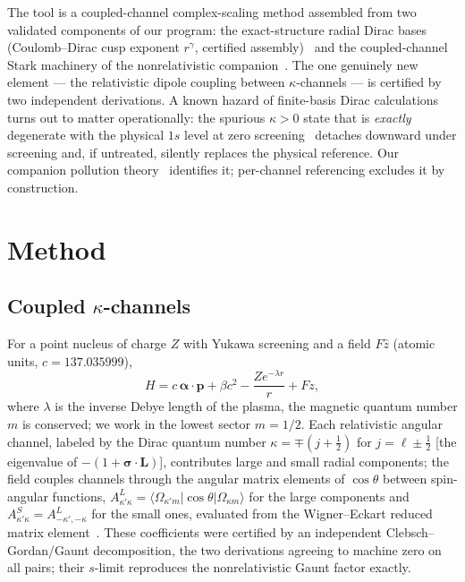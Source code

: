 \documentclass[aps,pra,twocolumn,superscriptaddress,floatfix,longbibliography]{revtex4-2}
\begin{document}
The tool is a coupled-channel complex-scaling method assembled from
two validated components of our program: the exact-structure radial
Dirac bases (Coulomb--Dirac cusp exponent $r^{\gamma}$, certified
assembly)~\cite{companionA,companionB} and the coupled-channel Stark
machinery of the nonrelativistic companion~\cite{companionD}. The
one genuinely new element --- the relativistic dipole coupling
between $\kappa$-channels --- is certified by two independent
derivations. A known hazard of finite-basis Dirac calculations turns
out to matter operationally: the spurious $\kappa>0$ state that is
\emph{exactly} degenerate with the physical $1s$ level at zero
screening~\cite{DrakeGoldman1981,TupitsynShabaev2008} detaches
downward under screening and, if untreated, silently replaces the
physical reference. Our companion pollution
theory~\cite{companionT} identifies it; per-channel referencing
excludes it by construction.

\section{Method}
\label{sec:method}

\subsection{Coupled $\kappa$-channels}

For a point nucleus of charge $Z$ with Yukawa screening and a field
$F\hat z$ (atomic units, $c=137.035999$),
\begin{equation}
H = c\,\boldsymbol{\alpha}\!\cdot\!\mathbf{p} + \beta c^{2}
    - \frac{Z e^{-\lambda r}}{r} + F z ,
\end{equation}
where $\lambda$ is the inverse Debye length of the plasma, the
magnetic quantum number $m$ is conserved; we work in the lowest
sector $m=1/2$. Each relativistic angular channel, labeled by the
Dirac quantum number $\kappa=\mp(j+\tfrac12)$ for
$j=\ell\pm\tfrac12$ [the eigenvalue of
$-(1+\boldsymbol{\sigma}\cdot\mathbf{L})$],
contributes large and small radial components; the field couples
channels through the angular matrix elements of $\cos\theta$
between spin-angular functions,
$A^{L}_{\kappa'\kappa}=\langle\Omega_{\kappa' m}|\cos\theta|
\Omega_{\kappa m}\rangle$ for the large components and
$A^{S}_{\kappa'\kappa}=A^{L}_{-\kappa',-\kappa}$ for the
small ones, evaluated from the Wigner--Eckart reduced matrix
element~\cite{Grant2007}. These coefficients were certified by an
independent Clebsch--Gordan/Gaunt decomposition, the two derivations
agreeing to machine zero on all pairs; their $s$-limit reproduces
the nonrelativistic Gaunt factor exactly.
\end{document}
